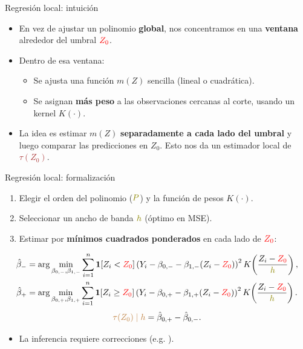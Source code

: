 \documentclass[10pt, xcolor=dvipsnames]{beamer}
\begin{document}
\begin{frame}{Regresión local: intuición}
\begin{itemize}
    \item En vez de ajustar un polinomio \textbf{global}, nos concentramos en una \textbf{ventana} alrededor del umbral $\textcolor{red}{Z_0}$. \smallspace %
    \item Dentro de esa ventana: \smallspace
    \begin{itemize}
        \item Se ajusta una función $m(Z)$ sencilla (lineal o cuadrática). \smallspace 
        \item Se asignan \textbf{más peso} a las observaciones cercanas al corte, usando un kernel $K(\cdot)$. \smallspace 
    \end{itemize}
    \item La idea es estimar $m(Z)$ \textbf{separadamente a cada lado del umbral} y luego comparar las predicciones en $Z_0$. Esto nos da un estimador local de \textcolor{brown}{\(\tau(Z_0)\)}.
\end{itemize}
\end{frame}


\begin{frame}{Regresión local: formalización}
\begin{enumerate}
    \item Elegir el orden del polinomio ($\textcolor{olive}{P}$) y la función de pesos $K(\cdot)$. %
    \item Seleccionar un ancho de banda $\textcolor{olive}{h}$ (óptimo en MSE). %
    \item Estimar por \textbf{mínimos cuadrados ponderados} en cada lado de $\textcolor{red}{Z_0}$: 
\end{enumerate}
{\small
\begin{align*}
\hat{\beta}_- &= \arg\min_{\beta_{0,-},\beta_{1,-}} \sum_{i=1}^{n} \mathbf{1}[Z_i < \textcolor{red}{Z_0}] 
\left(Y_i - \beta_{0,-} - \beta_{1,-}(Z_i - \textcolor{red}{Z_0})\right)^2 
K\!\left(\frac{Z_i - \textcolor{red}{Z_0}}{\textcolor{olive}{h}}\right), \\
\hat{\beta}_+ &= \arg\min_{\beta_{0,+},\beta_{1,+}} \sum_{i=1}^{n} \mathbf{1}[Z_i \geq \textcolor{red}{Z_0}] 
\left(Y_i - \beta_{0,+} - \beta_{1,+}(Z_i - \textcolor{red}{Z_0})\right)^2 
K\!\left(\frac{Z_i - \textcolor{red}{Z_0}}{\textcolor{olive}{h}}\right).
\end{align*}
}
\[
    \textcolor{brown}{\tau(Z_0) \mid h} = \hat{\beta}_{0,+} - \hat{\beta}_{0,-}.
\]
\begin{itemize}
    \item La inferencia requiere correcciones (e.g. \citealt{Calonico2014}).
\end{itemize}
\end{frame}
\end{document}
